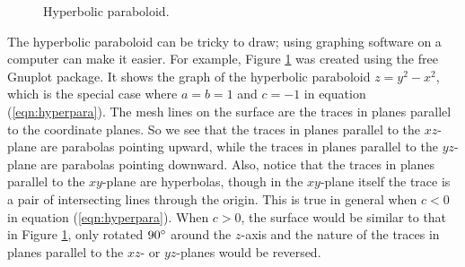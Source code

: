 \begin{figure}[h]
 \begin{center}
  
 \end{center}
 \caption[]{\quad Hyperbolic paraboloid.}
 \label{fig:hyperpara}
\end{figure}

The hyperbolic paraboloid can be tricky to draw; using graphing software on a computer can make it
easier.
For example, Figure \ref{fig:hyperpara} was created using the free Gnuplot package. 
It shows the graph
of the hyperbolic paraboloid
$z = y^2 - x^2$, which is the special case where $a = b = 1$ and $c = -1$ in equation (\ref{eqn:hyperpara}).
The mesh lines on the surface are the traces in planes parallel to the coordinate planes.
So we see that the traces in planes parallel to the $xz$-plane are parabolas pointing upward,
while the traces in planes parallel to the $yz$-plane are parabolas pointing downward. Also, notice that the traces in
planes parallel to the $xy$-plane are hyperbolas, though in the $xy$-plane itself the trace is a pair of intersecting
lines through the origin. 
This is true in general when $c < 0$ in equation (\ref{eqn:hyperpara}).
When $c > 0$, the surface would be similar to that
in Figure \ref{fig:hyperpara}, only rotated $90^\circ$ around the $z$-axis and the nature
of the traces in planes parallel to the $xz$- or $yz$-planes would be reversed.

